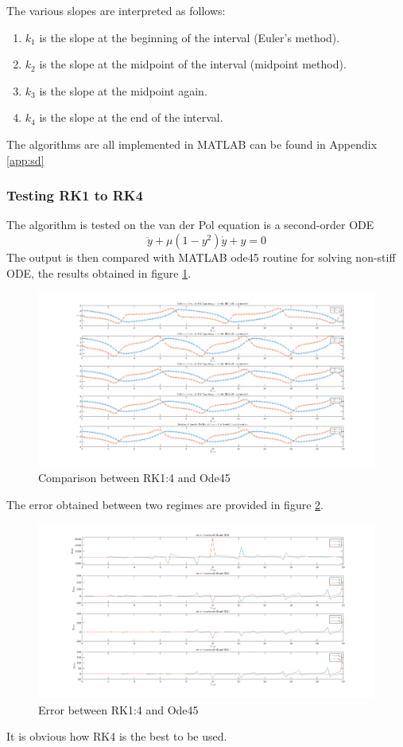 The various slopes are interpreted as follows:
\begin{enumerate}
    \item $k_{1}$ is the slope at the beginning of the interval (Euler's method).
    \item $k_{2}$ is the slope at the midpoint of the interval (midpoint method).
    \item  $k_{3}$ is the slope at the midpoint again.
    \item  $k_{4}$ is the slope at the end of the interval.
\end{enumerate}
The algorithms are all implemented in MATLAB can be found in Appendix \ref{app:sd}

\subsubsection{Testing RK1 to RK4}
The algorithm is tested on the van der Pol equation is a second-order ODE
\begin{equation} \label{eqn:van}
    \ddot{y}+\mu \left(1-y^2 \right) \dot{y} + y = 0
\end{equation}
The output is then compared with MATLAB ode45 routine for solving non-stiff ODE, the results obtained in figure \ref{fig:RK1_4}.
\begin{figure}[H]
    \centering
    \includegraphics[width = \textwidth]{Figures/Rk.png}
    \caption{Comparison between RK1:4 and Ode45}
    \label{fig:RK1_4}
\end{figure}
The error obtained between two regimes are provided in figure \ref{fig:error}.

\begin{figure}[H]
    \centering
    \includegraphics[width = \textwidth]{Figures/Error.png}
    \caption{Error between RK1:4 and Ode45}
    \label{fig:error}
\end{figure}
It is obvious how RK4 is the best to be used.

